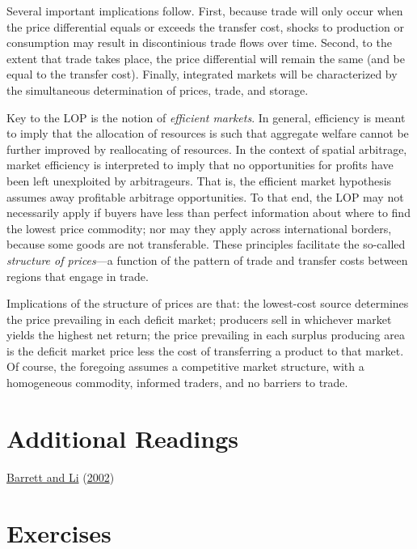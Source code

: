 \documentclass[
  oneside]{book}
\begin{document}
Several important implications follow. First, because trade will only occur when the price differential equals or exceeds the transfer cost, shocks to production or consumption may result in discontinious trade flows over time. Second, to the extent that trade takes place, the price differential will remain the same (and be equal to the transfer cost). Finally, integrated markets will be characterized by the simultaneous determination of prices, trade, and storage.

Key to the LOP is the notion of \emph{efficient markets}. In general, efficiency is meant to imply that the allocation of resources is such that aggregate welfare cannot be further improved by reallocating of resources. In the context of spatial arbitrage, market efficiency is interpreted to imply that no opportunities for profits have been left unexploited by arbitrageurs. That is, the efficient market hypothesis assumes away profitable arbitrage opportunities. To that end, the LOP may not necessarily apply if buyers have less than perfect information about where to find the lowest price commodity; nor may they apply across international borders, because some goods are not transferable. These principles facilitate the so-called \emph{structure of prices}---a function of the pattern of trade and transfer costs between regions that engage in trade.

Implications of the structure of prices are that: the lowest-cost source determines the price prevailing in each deficit market; producers sell in whichever market yields the highest net return; the price prevailing in each surplus producing area is the deficit market price less the cost of transferring a product to that market. Of course, the foregoing assumes a competitive market structure, with a homogeneous commodity, informed traders, and no barriers to trade.

\hypertarget{additional-readings}{%
\section*{Additional Readings}\label{additional-readings}}

\protect\hyperlink{ref-barrett2002}{Barrett and Li} (\protect\hyperlink{ref-barrett2002}{2002})

\hypertarget{exercises-2}{%
\section*{Exercises}\label{exercises-2}}
\end{document}
